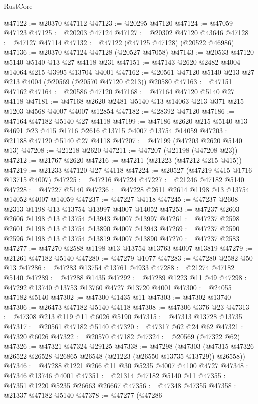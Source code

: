 \begin{lexlean}{RustCore}
\begin{coremodule}
@47122 := @20370 @47112
@47123 := @20295 @47120
@47124 := @47059 @47123
@47125 := @20203 @47124
@47127 := @20302 @47120 @43646
@47128 := @47127 @47114
@47132 := @47122 (@47125 @47128) (@20522 @46986)
@47136 := @20370 @47124 @47128 (@20527 @47058)
@47143 := @20533 @47120 @5140 @5140 @13 @27 @4118 @231
@47151 := @47143 @2620 @2482 @4004 @14064 @215 @3995 @13704 @4001
@47162 := @20561 @47120 @5140 @213 @27 @213 @4004 (@20569 (@20570 @47120 @213)) @20580
@47163 := @47151 @47162
@47164 := @20586 @47120
@47168 := @47164 @47120 @5140 @27 @4118
@47181 := @47168 @2620 @2481 @5140 @13 @14063 @213 @371 @215 @1203 @4568 @4007 @4007 @12854
@47182 := @28392 @47120
@47186 := @47164 @47182 @5140 @27 @4118
@47199 := @47186 @2620 @215 @5140 @13 @4691 @23 @415 @1716 @2616 @13715 @4007 @13754 @14059
@47203 := @21188 @47120 @5140 @27 @4118
@47207 := @47199 (@47203 @2620 @5140 @13)
@47208 := @21218 @2620
@47211 := @47207 (@21198 (@47208 @23))
@47212 := @21767 @2620
@47216 := @47211 (@21223 (@47212 @215 @415))
@47219 := @21233 @47120 @27 @4118
@47224 := @20527 (@47219 @415 @1716 @13715 @4007)
@47225 := @47216 @47224
@47227 := @21246 @47182 @5140
@47228 := @47227 @5140
@47236 := @47228 @2611 @2614 @1198 @13 @13754 @14052 @4007 @14059
@47237 := @47227 @4118
@47245 := @47237 @2608 @2313 @1198 @13 @13754 @13997 @4007 @14052
@47253 := @47237 @2603 @2606 @1198 @13 @13754 @13943 @4007 @13997
@47261 := @47237 @2598 @2601 @1198 @13 @13754 @13890 @4007 @13943
@47269 := @47237 @2590 @2596 @1198 @13 @13754 @13819 @4007 @13890
@47270 := @47237 @2583
@47277 := @47270 @2588 @1198 @13 @13754 @13763 @4007 @13819
@47279 := @21261 @47182 @5140
@47280 := @47279 @1077
@47283 := @47280 @2582 @50 @13
@47286 := @47283 @13754 @13761 @4933
@47288 := @21274 @47182 @5140
@47289 := @47288 @1435
@47292 := @47289 @1223 @11 @49
@47298 := @47292 @13740 @13753 @13760 @4727 @13720 @4001
@47300 := @24055 @47182 @5140
@47302 := @47300 @1435 @11
@47303 := @47302 @13740
@47306 := @26473 @47182 @5140 @4118
@47308 := @47306 @376 @23
@47313 := @47308 @213 @119 @11 @6026 @5190
@47315 := @47313 @13728 @13735
@47317 := @20561 @47182 @5140
@47320 := @47317 @62 @24 @62
@47321 := @47320 @6026
@47322 := @20570 @47182
@47324 := @20569 (@47322 @62)
@47326 := @47321 @47324 @29125
@47338 := @47298
    (@47303 (@47315 @47326 @26522 @26528 @26865 @26548 (@21223 (@26550 @13735 @13729)) @26558))
@47346 := @47288 @1221 @266 @11 @30 @5235 @4007 @4100 @4727
@47348 := @47346 @13746 @4001
@47351 := @21314 @47182 @5140 @11
@47355 := @47351 @1220 @5235 @26663 @26667
@47356 := @47348 @47355
@47358 := @21337 @47182 @5140
@47378 := @47277
    (@47286

\end{coremodule}
\end{lexlean}

